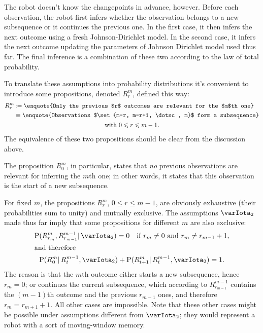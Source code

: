 \documentclass[\ifafour a4paper,12pt,\else a5paper,10pt,\fi%
onecolumn,oneside,article,%
british%
]{memoir}
\theoremstyle{remark}
\theoremstyle{innote}
\newcommand*{\defd}{\coloneqq}
\renewcommand{\le}{\leqslant}%
\DeclarePairedDelimiter\set{\{}{\}}
\newcommand*{\p}{\mathrm{P}}%
\renewcommand*{\|}{\mathpunct{|}}
\newcommand*{\yI}{\varIota}
\newcommand*{\yMc}{\yI_2}
\begin{document}
The robot doesn't know the changepoints in advance, however. Before each
observation, the robot first infers whether the observation belongs to a
new subsequence or it continues the previous one. In the first case, it
then infers the next outcome using a fresh Johnson-Dirichlet model. In the
second case, it infers the next outcome updating the parameters of Johnson
Dirichlet model used thus far. The final inference is a combination of
these two according to the law of total probability.

To translate these assumptions into probability distributions it's
convenient to introduce some propositions, denoted $R^{m}_{r}$, defined
this way:
\begin{multline}
  \label{eq:def_prop_changepoint}
  \begin{aligned}
    R^{m}_{r} &\defd
    \text{\enquote{Only the previous $r$ outcomes are relevant for the $m$th
        one}}
    \\
    &\equiv\text{\enquote{Observations
        $\set{m-r, m-r+1, \dotsc, m}$ form a subsequence}}
  \end{aligned}
  \\ \text{with $0\le r \le m-1$}.
\end{multline}
The equivalence of these two propositions should be clear from the
discussion above.

The proposition $R^{m}_{0}$, in particular, states that \emph{no} previous
observations are relevant for inferring the $m$th one; in other words, it
states that this observation is the start of a new subsequence.

For fixed $m$, the propositions $R^{m}_{r}$, $0\le r \le m-1$, are
obviously exhaustive (their probabilities sum to unity) and mutually
exclusive. The assumptions $\yMc$ made thus far imply that some
propositions for different $m$ are also exclusive:
\begin{gather}
  \label{eq:exclusive_across_m}
  \p(R^{m}_{r_{m}}, R^{m-1}_{r_{m-1}} \| \yMc) = 0
  \quad\text{if $r_{m}\ne 0$ and $r_{m} \ne r_{m-1}+1$},
\\\intertext{and therefore}
  \label{eq:exhaustive_R_from_previous}
  \p(R^{m}_{0} \| R^{m-1}_{t},\yMc) +
  \p(R^{m}_{t+1} \| R^{m-1}_{t},\yMc) = 1.
\end{gather}
The reason is that the $m$th outcome either starts a new subsequence, hence
$r_{m}=0$; or continues the current subsequence, which according to
$R^{m-1}_{r_{m-1}}$ contains the $(m-1)$th outcome and the previous
$r_{m-1}$ ones, and therefore $r_{m}=r_{m+1}+1$. All other cases are
impossible. Note that these other cases might be possible under assumptions
different from $\yMc$; they would represent a robot with a sort of
moving-window memory.
\end{document}
